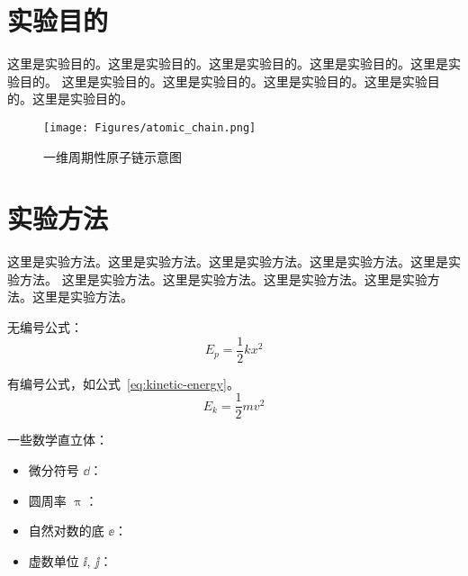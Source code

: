 
\setcounter{page}{1}


\titleformat{\section}{\raggedright\Large\bfseries}{\thesection}{1em}{}

\section{实验目的}

这里是实验目的。这里是实验目的。这里是实验目的。这里是实验目的。这里是实验目的。
这里是实验目的。这里是实验目的。这里是实验目的。这里是实验目的。这里是实验目的。

\begin{figure}[!htp]
    \centering
    \texttt{[image: Figures/atomic\_chain.png]}
    \caption{一维周期性原子链示意图}
    \label{fig:atomic-chain}
\end{figure}

\section{实验方法}\label{sec:exp-method}

这里是实验方法。这里是实验方法。这里是实验方法。这里是实验方法。这里是实验方法。
这里是实验方法。这里是实验方法。这里是实验方法。这里是实验方法。这里是实验方法。

无编号公式：
\begin{equation*}
    E_p = \frac{1}{2} k x^2
\end{equation*}

有编号公式，如公式~\ref{eq:kinetic-energy}。
\begin{equation}
    E_k = \frac{1}{2} m v^2
    \label{eq:kinetic-energy}
\end{equation}


一些数学直立体：
\begin{itemize}
  \item 微分符号 $\dd$：
  \item 圆周率 $\uppi$：
  \item 自然对数的底 $\ee$：
  \item 虚数单位 $\ii$, $\jj$： 
\end{itemize}


